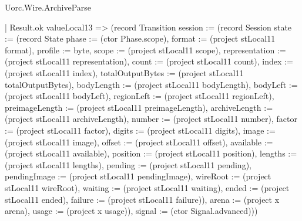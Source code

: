 \begin{lexlean}{Uorc.Wire.ArchiveParse}
\begin{semanticmodule}
{      | Result.ok valueLocal13 => (record Transition {session := (record Session {state := (record State {phase := (ctor Phase.scope), format := (project stLocal11 format), profile := byte, scope := (project stLocal11 scope), representation := (project stLocal11 representation), count := (project stLocal11 count), index := (project stLocal11 index), totalOutputBytes := (project stLocal11 totalOutputBytes), bodyLength := (project stLocal11 bodyLength), bodyLeft := (project stLocal11 bodyLeft), regionLeft := (project stLocal11 regionLeft), preimageLength := (project stLocal11 preimageLength), archiveLength := (project stLocal11 archiveLength), number := (project stLocal11 number), factor := (project stLocal11 factor), digits := (project stLocal11 digits), image := (project stLocal11 image), offset := (project stLocal11 offset), available := (project stLocal11 available), position := (project stLocal11 position), lengths := (project stLocal11 lengths), pending := (project stLocal11 pending), pendingImage := (project stLocal11 pendingImage), wireRoot := (project stLocal11 wireRoot), waiting := (project stLocal11 waiting), ended := (project stLocal11 ended), failure := (project stLocal11 failure)}), arena := (project x arena), usage := (project x usage)}), signal := (ctor Signal.advanced)}))
}
\end{semanticmodule}
\end{lexlean}
